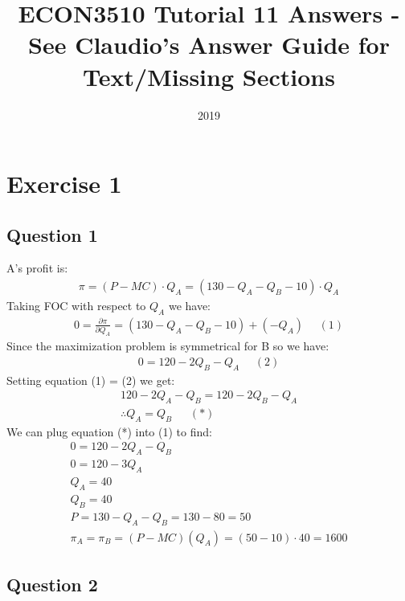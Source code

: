 \documentclass{article}
\title{ECON3510 Tutorial 11 Answers - See Claudio's Answer Guide for Text/Missing Sections}
\date{2019}
\begin{document}
\maketitle

\section{Exercise 1}
\vspace{6mm}
\subsection{Question 1}

A's profit is:
\begin{gather*}
  \pi = (P - MC) \cdot Q_{A} = (130 - Q_{A} - Q_{B} - 10) \cdot Q_{A}
\end{gather*}
Taking FOC with respect to $Q_{A}$ we have:
\begin{gather*}
  0 = \frac{\partial \pi}{\partial Q_{A}} = (130 - Q_{A} - Q_{B}  - 10) + (-Q_{A}) \ \ \  \ \  \ (1)
\end{gather*}
Since the maximization problem is symmetrical for B so we have:
\begin{gather*}
  0 = 120 - 2Q_{B} - Q_{A} \ \ \  \ \  \  (2)
\end{gather*}
Setting equation (1) = (2) we get:
\begin{gather*}
  120 - 2Q_{A} - Q_{B} = 120 - 2Q_{B} - Q_{A} \\
  \therefore Q_{A} = Q_{B} \ \ \ \ \ \ \ (*)
\end{gather*}
We can plug equation (*) into (1) to find:
\begin{gather*}
  0 = 120 - 2Q_{A} - Q_{B} \\
  0 = 120 - 3Q_{A} \\
  Q_{A} = 40 \\
  Q_{B} = 40 \\
  P = 130 - Q_{A} - Q_{B} = 130 - 80 = 50 \\
  \pi_{A} = \pi_{B} = (P - MC)(Q_{A}) = (50 - 10) \cdot 40 = 1600
\end{gather*}

\vspace{6mm}
\subsection{Question 2}
\end{document}
